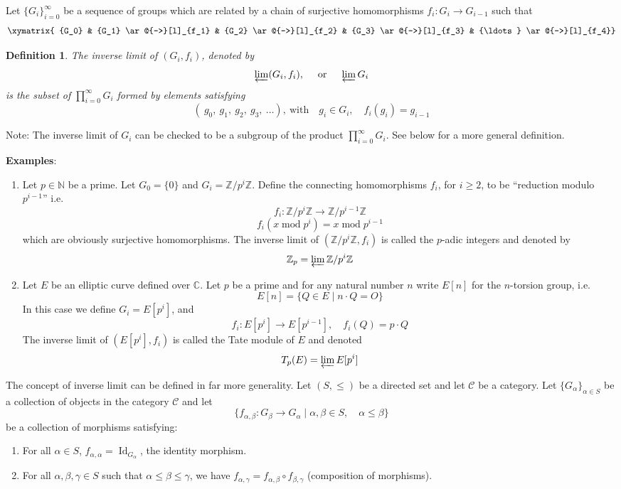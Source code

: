 \documentclass[12pt]{article}
\newtheorem{defn}{Definition}
\newcommand{\Nats}{\mathbb{N}}
\newcommand{\Ints}{\mathbb{Z}}
\newcommand{\Complex}{\mathbb{C}}
\begin{document}
Let $\{ G_i \}_{i=0}^{\infty}$ be a sequence of groups which are
related by a chain of surjective homomorphisms $f_i\colon G_i \to
G_{i-1}$ such that
$$\xymatrix{
{G_0} & {G_1} \ar@{->}[l]_{f_1} & {G_2} \ar@{->}[l]_{f_2} & {G_3}
\ar@{->}[l]_{f_3} & {\ldots} \ar@{->}[l]_{f_4}}$$

\begin{defn} The \emph{inverse limit} of $(G_i,f_i)$, denoted by
$$\varprojlim(G_i,f_i),\quad \text{ or }\quad \varprojlim
G_i$$ is the subset of $\prod_{i=0}^{\infty} G_i$ formed by
elements satisfying
$$(\ g_0,\ g_1,\ g_2,\ g_3,\ \ldots),\ \text{with}\quad g_i\in G_i, \quad
f_i(g_i)=g_{i-1}$$
\end{defn}

Note: The inverse limit of $G_i$ can be checked to be a subgroup
of the product $\prod_{i=0}^{\infty} G_i$. See below for a more general definition.

{\bf Examples}:
\begin{enumerate}
\item Let $p\in\Nats$ be a prime. Let $G_0=\{0\}$ and
$G_i=\Ints/p^i\Ints$. Define the connecting homomorphisms $f_i$, for $i\geq 2$, to
be ``reduction modulo $p^{i-1}$'' i.e.
$$f_i\colon \Ints/p^i\Ints \to \Ints/p^{i-1}\Ints$$
$$f_i(x \operatorname{mod}p^i)= x \operatorname{mod} p^{i-1}$$
which are obviously surjective homomorphisms. The inverse limit of
$(\Ints/p^i\Ints, f_i)$ is called the $p$-adic integers and
denoted by
$$\Ints_p=\varprojlim\Ints/p^i\Ints$$

\item Let $E$ be an elliptic curve defined over $\Complex$. Let
$p$ be a prime and for any natural number $n$ write $E[n]$ for the
$n$-torsion group, i.e.
$$E[n]=\{ Q\in E \mid n\cdot Q=O\}$$
In this case we define $G_i=E[p^i]$, and
$$f_i\colon E[p^i] \to E[p^{i-1}], \quad f_i(Q)=p\cdot Q$$
The inverse limit of $(E[p^i],f_i)$ is called the Tate module of
$E$ and denoted
$$T_p(E)=\varprojlim E[p^i]$$

\end{enumerate}

The concept of inverse limit can be defined in far more
generality. Let $(S,\leq)$ be a directed set and let $\mathcal{C}$
be a category. Let $\{ G_{\alpha}\}_{\alpha\in S}$ be a collection
of objects in the category $\mathcal{C}$ and let
$$\{f_{\alpha,\beta}\colon G_{\beta} \to G_{\alpha}\mid \alpha,\beta \in S,\quad \alpha\leq\beta \}$$ be a collection of
morphisms satisfying:
\begin{enumerate}
\item For all $\alpha\in S$,
$f_{\alpha,\alpha}=\operatorname{Id}_{G_{\alpha}}$, the identity
morphism.

\item For all $\alpha,\beta,\gamma\in S$ such that $\alpha \leq
\beta \leq \gamma$, we have $f_{\alpha,\gamma} = f_{\alpha,\beta}
\circ f_{\beta,\gamma}$ (composition of morphisms).
\end{enumerate}
\end{document}
